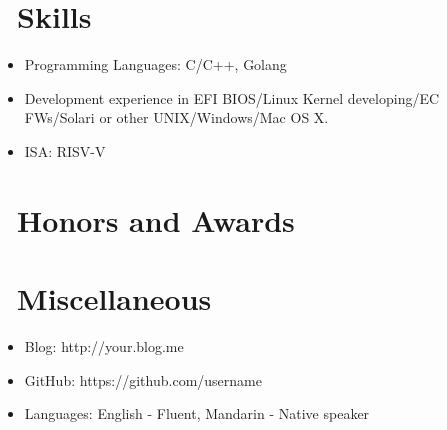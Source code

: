 \documentclass{resume}
\begin{document}

\section{\faCogs\ Skills}
\begin{itemize}[parsep=0.5ex]
  \item Programming Languages: C/C++, Golang
  \item Development experience in EFI BIOS/Linux Kernel developing/EC FWs/Solari or other UNIX/Windows/Mac OS X.
  \item ISA: RISV-V
\end{itemize}

\section{\faHeartO\ Honors and Awards}

\section{\faInfo\ Miscellaneous}
\begin{itemize}[parsep=0.5ex]
  \item Blog: http://your.blog.me
  \item GitHub: https://github.com/username
  \item Languages: English - Fluent, Mandarin - Native speaker
\end{itemize}

%
%
\end{document}

